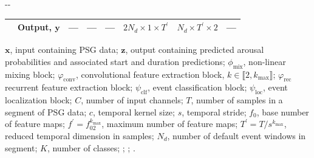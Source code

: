 \begin{table}[tb]
\begin{adjustwidth*}{}{-\marginparwidth-\marginparsep}
\begin{threeparttable}
\begin{tabular}{@{}llllllll@{}}
             & Output, \(\mathbf{y}\) & --- & --- & --- & $2 N_d \times 1 \times T^{\prime}$ & $N_d \times T^{\prime} \times 2$ & --- \\
            \bottomrule
        \end{tabular}
        \begin{tablenotes}
            \small \item \(\mathbf{x}\), input containing \ac{PSG} data; $\mathbf{z}$, output containing predicted arousal probabilities and associated start and duration predictions; \( \phi_{\mathrm{mix}} \), non-linear mixing block; \(\varphi_{\mathrm{conv}}\), convolutional feature extraction block, \( k \in \llbracket 2, k_{\max} \rrbracket \); \( \varphi_{\mathrm{rec}} \) recurrent feature extraction block; \( \psi_{\mathrm{clf}} \), event classification block; \( \psi_{\mathrm{loc}} \), event localization block; $C$, number of input channels; $T$, number of samples in a segment of \ac{PSG} data; $c$, temporal kernel size; $s$, temporal stride; $f_0$, base number of feature maps; $f^{\prime}=f_02^{k_{\mathrm{max}}}$, maximum number of feature maps; $T^{\prime} = T/s^{k_{\mathrm{max}}}$, reduced temporal dimension in samples; $N_d$, number of default event windows in segment; $K$, number of classes; %
            ; %
            ; %
            .
        \end{tablenotes}
    \end{threeparttable}
    \end{adjustwidth*}
\end{table}

